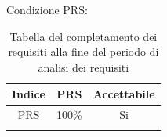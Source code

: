 		Condizione PRS:
		\begin{center}
			\begin{longtable}{|c|c|c|}
			\hline
			\rowcolor{lighter-grayer}
			\textbf{Indice} & \textbf{PRS} & \textbf{Accettabile} \\
			\hline
			\endfirsthead
			\hline
			PRS & 100\% & Si \\
			\hline
			\rowcolor{white}
			\caption{Tabella del completamento dei requisiti alla fine del periodo di analisi dei requisiti}
		\end{longtable}
	\end{center}
